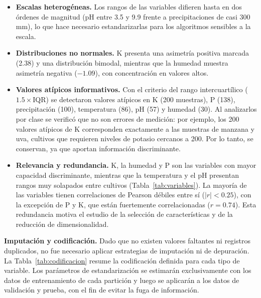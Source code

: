 \documentclass[conference]{IEEEtran}
\begin{document}
\begin{itemize}
    \item \textbf{Escalas heterogéneas.} Los rangos de las variables difieren hasta en dos órdenes de magnitud (pH entre 3.5 y 9.9 frente a precipitaciones de casi 300\,mm), lo que hace necesario estandarizarlas para los algoritmos sensibles a la escala.
    \item \textbf{Distribuciones no normales.} K presenta una asimetría positiva marcada (2.38) y una distribución bimodal, mientras que la humedad muestra asimetría negativa ($-1.09$), con concentración en valores altos.
    \item \textbf{Valores atípicos informativos.} Con el criterio del rango intercuartílico ($1.5\times\mathrm{IQR}$) se detectaron valores atípicos en K (200 muestras), P (138), precipitación (100), temperatura (86), pH (57) y humedad (30). Al analizarlos por clase se verificó que no son errores de medición: por ejemplo, los 200 valores atípicos de K corresponden exactamente a las muestras de manzana y uva, cultivos que requieren niveles de potasio cercanos a 200. Por lo tanto, se conservan, ya que aportan información discriminante.
    \item \textbf{Relevancia y redundancia.} K, la humedad y P son las variables con mayor capacidad discriminante, mientras que la temperatura y el pH presentan rangos muy solapados entre cultivos (Tabla~\ref{tab:variables}). La mayoría de las variables tienen correlaciones de Pearson débiles entre sí ($|r|<0.25$), con la excepción de P y K, que están fuertemente correlacionadas ($r=0.74$). Esta redundancia motiva el estudio de la selección de características y de la reducción de dimensionalidad.
\end{itemize}

\textbf{Imputación y codificación.} Dado que no existen valores faltantes ni registros duplicados, no fue necesario aplicar estrategias de imputación ni de depuración. La Tabla~\ref{tab:codificacion} resume la codificación definida para cada tipo de variable. Los parámetros de estandarización se estimarán exclusivamente con los datos de entrenamiento de cada partición y luego se aplicarán a los datos de validación y prueba, con el fin de evitar la fuga de información.
\end{document}
